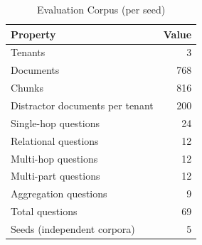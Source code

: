 \begin{table}[!htbp]
\centering
\caption{Evaluation Corpus (per seed)}
\label{tab:dataset}
\footnotesize
\begin{tabular*}{\columnwidth}{@{\extracolsep{\fill}}lr@{}}
\toprule
Property & Value \\
\midrule
Tenants & 3 \\
Documents & 768 \\
Chunks & 816 \\
Distractor documents per tenant & 200 \\
\midrule
Single-hop questions & 24 \\
Relational questions & 12 \\
Multi-hop questions & 12 \\
Multi-part questions & 12 \\
Aggregation questions & 9 \\
Total questions & 69 \\
Seeds (independent corpora) & 5 \\
\bottomrule
\end{tabular*}
\end{table}
